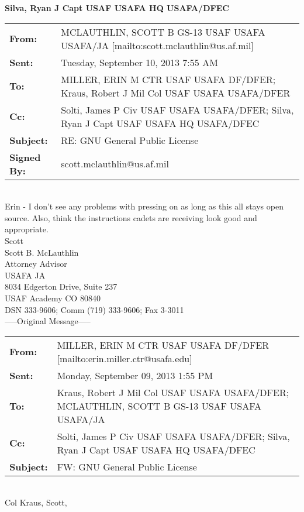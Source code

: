\documentclass{article}
\begin{document}
\noindent\textbf{\large{Silva, Ryan J Capt USAF USAFA HQ USAFA/DFEC}}

\noindent\makebox[\linewidth]{\rule[5mm]{\linewidth}{3.5pt}}

\noindent \begin{tabu} to \textwidth{l X[l]}

    \textbf{From:} & MCLAUTHLIN, SCOTT B GS-13 USAF USAFA USAFA/JA [mailto:scott.mclauthlin@us.af.mil]\\ 
    \textbf{Sent:} & Tuesday, September 10, 2013 7:55 AM \\
    \textbf{To:} & MILLER, ERIN M CTR USAF USAFA DF/DFER; Kraus, Robert J Mil Col USAF USAFA USAFA/DFER \\
    \textbf{Cc:} & Solti, James P Civ USAF USAFA USAFA/DFER; Silva, Ryan J Capt USAF USAFA HQ USAFA/DFEC \\
    \textbf{Subject:} & RE: GNU General Public License \\
    \textbf{Signed By:} & scott.mclauthlin@us.af.mil \\
\end{tabu}
\hspace{0pt} \\

Erin - I don't see any problems with pressing on as long as this all stays open source.  Also, think the instructions cadets are receiving look good and appropriate. \\

Scott \\

\noindent Scott B. McLauthlin \\
Attorney Advisor \\
USAFA JA \\
8034 Edgerton Drive, Suite 237 \\
USAF Academy CO 80840 \\
DSN 333-9606; Comm (719) 333-9606; Fax 3-3011 \\

\noindent-----Original Message----- \\

\noindent \begin{tabu} to \textwidth{l X[l]}

 \textbf{From:} & MILLER, ERIN M CTR USAF USAFA DF/DFER [mailto:erin.miller.ctr@usafa.edu]  \\
 \textbf{Sent:} & Monday, September 09, 2013 1:55 PM \\
 \textbf{To:} & Kraus, Robert J Mil Col USAF USAFA USAFA/DFER; MCLAUTHLIN, SCOTT B GS-13 USAF USAFA USAFA/JA \\
 \textbf{Cc:} & Solti, James P Civ USAF USAFA USAFA/DFER; Silva, Ryan J Capt USAF USAFA HQ USAFA/DFEC \\
 \textbf{Subject:} & FW: GNU General Public License \\
\end{tabu}
\hspace{0pt} \\
Col Kraus, Scott, \\
\end{document}
